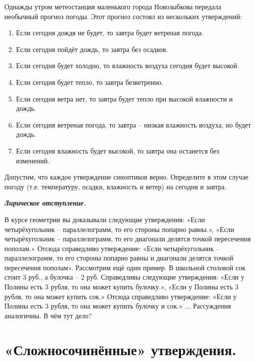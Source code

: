 \begin{thm} \label{8.1 thm2}
    Однажды утром метеостанция маленького города Новозыбкова передала необычный прогноз погоды. Этот прогноз состоял из нескольких утверждений:
    \begin{enumerate}
        \item Если сегодня дождя не будет, то завтра будет ветреная погода.
        \item Если сегодня пойдёт дождь, то завтра без осадков.
        \item Если сегодня будет холодно, то влажность воздуха сегодня будет высокой.
        \item Если сегодня будет тепло, то завтра безветренно.
        \item Если сегодня ветра нет, то завтра будет тепло при высокой влажности и дождь.
        \item Если сегодня ветреная погода, то завтра – низкая влажность воздуха, но будет дождь.
        \item Если сегодня влажность будет высокой, то завтра она останется без изменений.  
    \end{enumerate}
    Допустим, что каждое утверждение синоптиков верно. Определите в этом случае погоду (т.е. температуру, осадки, влажность и ветер) на сегодня и завтра.
\end{thm}


\begin{center}
    \textit{\textbf{Лирическое отступление.}}
\end{center}

В курсе геометрии вы доказывали следующие утверждения: «Если четырёхугольник – параллелограмм, то его стороны попарно равны.», «Если четырёхугольник – параллелограмм, то его диагонали делятся точкой пересечения пополам.» Отсюда справедливо утверждение: «Если четырёхугольник – параллелограмм, то его стороны попарно равны и диагонали делятся точкой пересечения пополам».
Рассмотрим ещё один пример. В школьной столовой сок стоит 3 руб., а булочка – 2 руб. Справедливы следующие утверждения: «Если у Полины есть 3 рубля, то она может купить булочку.», «Если у Полины
есть 3 рубля, то она может купить сок.» Отсюда справедливо утверждение: «Если у Полины есть 3 рубля, то
она может купить булочку и сок.» ... Рассуждения аналогичны. В чём тут дело?

\section{«Сложносочинённые» утверждения.}

